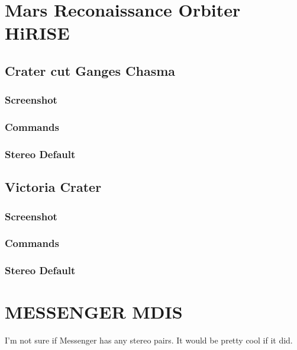 \section{Mars Reconaissance Orbiter HiRISE}

\subsection{Crater cut Ganges Chasma}

\subsubsection*{Screenshot}

\subsubsection*{Commands}

\subsubsection*{Stereo Default}

\subsection{Victoria Crater}

\subsubsection*{Screenshot}

\subsubsection*{Commands}

\subsubsection*{Stereo Default}

\section{MESSENGER MDIS}

I'm not sure if Messenger has any stereo pairs. It would be pretty
cool if it did.
